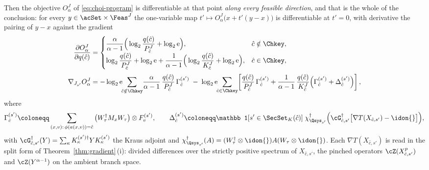 \begin{corollary}
Then the objective $O^{J}_{\alpha}$ of \eqref{eq:choi-program} is
differentiable at that point \emph{along every feasible direction}, and
that is the whole of the conclusion: for every
$y\in\acSet\times\Feas^{J}$ the one-variable map
$t'\mapsto O^{J}_{\alpha}\big(x+t'(y-x)\big)$ is differentiable at
$t'=0$, with derivative the pairing of $y-x$ against the gradient
\begin{align}
  \frac{\partial O^{J}_{\alpha}}{\partial q(\hat c)}
  &=\begin{cases}
  \dfrac{\alpha}{\alpha-1}\Big(\log_2\dfrac{q(\hat c)}{P^{J}_{\hat c}}
  +\log_2\mathrm e\Big), & \hat c\notin\Chkey,\\[1.2ex]
  \log_2\dfrac{q(\hat c)}{P^{J}_{\hat c}}+\log_2\mathrm e
  +\dfrac{1}{\alpha-1}\Big(\log_2\dfrac{q(\hat c)}{K^{J}_{\hat c}}
  +\log_2\mathrm e\Big), & \hat c\in\Chkey,
  \end{cases}\label{eq:grad-q}\\[0.6ex]
  \nabla_{J_{s'}}O^{J}_{\alpha}
  &=-\log_2\mathrm e\!\!\sum_{\hat c\notin\Chkey}\!
  \frac{\alpha}{\alpha-1}\,\frac{q(\hat c)}{P^{J}_{\hat c}}\,
  \Gamma^{(s')}_{\hat c}
  \;-\;\log_2\mathrm e\!\!\sum_{\hat c\in\Chkey}\!\left[
  \frac{q(\hat c)}{P^{J}_{\hat c}}\,\Gamma^{(s')}_{\hat c}
  +\frac{1}{\alpha-1}\,\frac{q(\hat c)}{K^{J}_{\hat c}}
  \Big(\Gamma^{(s')}_{\hat c}+\Delta^{(s')}_{\hat c}\Big)\right],
  \label{eq:grad-J}
\end{align}
where
\begin{equation}\label{eq:grad-pieces}
  \Gamma^{(s')}_{\hat c}\coloneqq
  \sum_{(x,v):\,\phi(a(x,v))=\hat c}
  \big(W_{\tau}^{\dagger}M_xW_{\tau}\big)\otimes F^{(s')}_v,
  \qquad
  \Delta^{(s')}_{\hat c}\coloneqq
  \mathbb 1[s'\in\SecSet_K(\hat c)]\;
  \chi_{\Qsys_{s'}}^{\dagger}\Big(
  \cG_{\hat c,s'}^{\dagger}\big[\nabla T(X_{\hat c,s'})
  -\idon{}\big]\Big),
\end{equation}
with $\cG^{\dagger}_{\hat c,s'}(Y)=\sum_{\kappa}K^{(s')\dagger}_{\kappa}
YK^{(s')}_{\kappa}$ the Kraus adjoint and
$\chi^{\dagger}_{\Qsys_{s'}}(A)=(W_{\tau}^{\dagger}\otimes\idon{})A
(W_{\tau}\otimes\idon{})$. Each $\nabla T(X_{\hat c,s'})$ is read in the
split form of Theorem~\ref{thm:gradient}\,(i): divided differences over
the strictly positive spectrum of $X_{\hat c,s'}$, the pinched operators
$\cZ(X^{p}_{\hat c,s'})$ and $\cZ(Y^{\alpha-1})$ on the ambient branch
space.


\end{corollary}
